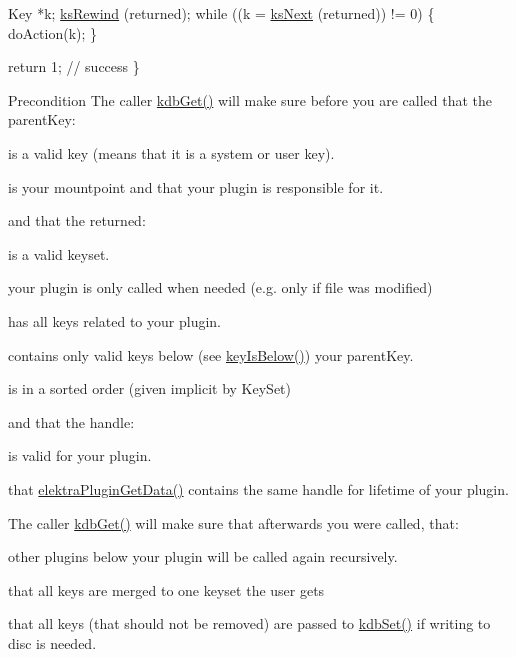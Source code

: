 \begin{DoxyCodeInclude}
        Key *k;
        \hyperlink{group__keyset_gabe793ff51f1728e3429c84a8a9086b70}{ksRewind} (returned);
        \textcolor{keywordflow}{while} ((k = \hyperlink{group__keyset_ga317321c9065b5a4b3e33fe1c399bcec9}{ksNext} (returned)) != 0)
        \{
                doAction(k);
        \}

        \textcolor{keywordflow}{return} 1; \textcolor{comment}{// success}
\}
\end{DoxyCodeInclude}
 \begin{DoxyPrecond}{Precondition}
The caller \hyperlink{group__kdb_ga28e385fd9cb7ccfe0b2f1ed2f62453a1}{kdb\-Get()} will make sure before you are called that the parent\-Key\-:
\begin{DoxyItemize}
\item is a valid key (means that it is a system or user key).
\item is your mountpoint and that your plugin is responsible for it. 
\end{DoxyItemize}

and that the returned\-:
\begin{DoxyItemize}
\item is a valid keyset.
\item your plugin is only called when needed (e.\-g. only if file was modified)
\item has {\ttfamily all} keys related to your plugin.
\item contains only valid keys below (see \hyperlink{group__keytest_ga03332b5d97c76a4fd2640aca4762b8df}{key\-Is\-Below()}) your parent\-Key.
\item is in a sorted order (given implicit by Key\-Set) 
\end{DoxyItemize}

and that the handle\-:
\begin{DoxyItemize}
\item is valid for your plugin.
\item that \hyperlink{group__plugin_gaafcf3216b46292f222b8cc7828b4dd20}{elektra\-Plugin\-Get\-Data()} contains the same handle for lifetime of your plugin.
\end{DoxyItemize}

The caller \hyperlink{group__kdb_ga28e385fd9cb7ccfe0b2f1ed2f62453a1}{kdb\-Get()} will make sure that afterwards you were called, that\-:
\begin{DoxyItemize}
\item other plugins below your plugin will be called again recursively.
\item that all keys are merged to one keyset the user gets
\item that all keys (that should not be removed) are passed to \hyperlink{group__kdb_ga11436b058408f83d303ca5e996832bcf}{kdb\-Set()} if writing to disc is needed.
\end{DoxyItemize}
\end{DoxyPrecond}
